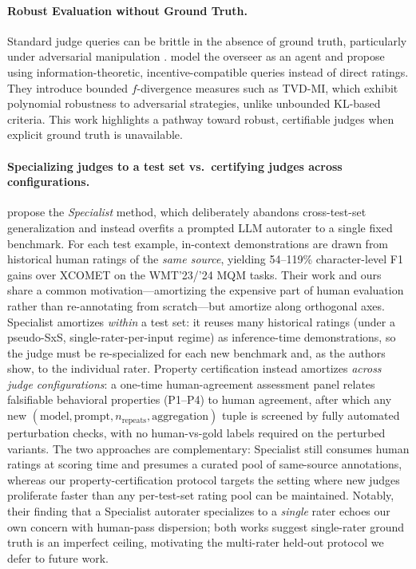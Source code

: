 \paragraph{Robust Evaluation without Ground Truth.}
Standard judge queries can be brittle in the absence of ground truth, particularly under adversarial manipulation \citep{Zhuo2024ICEScore,TongZhang2024CodeJudge}. \citet{robertson2025stepbystep} model the overseer as an agent and propose using information-theoretic, incentive-compatible queries instead of direct ratings. They introduce bounded $f$-divergence measures such as TVD-MI, which exhibit polynomial robustness to adversarial strategies, unlike unbounded KL-based criteria. This work highlights a pathway toward robust, certifiable judges when explicit ground truth is unavailable.

\paragraph{Specializing judges to a test set vs.\ certifying judges across configurations.}
\citet{finkelstein2024specialist} propose the \emph{Specialist} method, which deliberately abandons cross-test-set generalization and instead overfits a prompted LLM autorater to a single fixed benchmark.
For each test example, in-context demonstrations are drawn from historical human ratings of the \emph{same source}, yielding 54--119\% character-level F1 gains over \textsc{XCOMET} on the WMT'23/'24 MQM tasks.
Their work and ours share a common motivation---amortizing the expensive part of human evaluation rather than re-annotating from scratch---but amortize along orthogonal axes.
Specialist amortizes \emph{within} a test set: it reuses many historical ratings (under a pseudo-SxS, single-rater-per-input regime) as inference-time demonstrations, so the judge must be re-specialized for each new benchmark and, as the authors show, to the individual rater.
Property certification instead amortizes \emph{across judge configurations}: a one-time human-agreement assessment panel relates falsifiable behavioral properties (P1--P4) to human agreement, after which any new $(\text{model},\text{prompt},n_\text{repeats},\text{aggregation})$ tuple is screened by fully automated perturbation checks, with no human-vs-gold labels required on the perturbed variants.
The two approaches are complementary: Specialist still consumes human ratings at scoring time and presumes a curated pool of same-source annotations, whereas our property-certification protocol targets the setting where new judges proliferate faster than any per-test-set rating pool can be maintained.
Notably, their finding that a Specialist autorater specializes to a \emph{single} rater echoes our own concern with human-pass dispersion; both works suggest single-rater ground truth is an imperfect ceiling, motivating the multi-rater held-out protocol we defer to future work.

